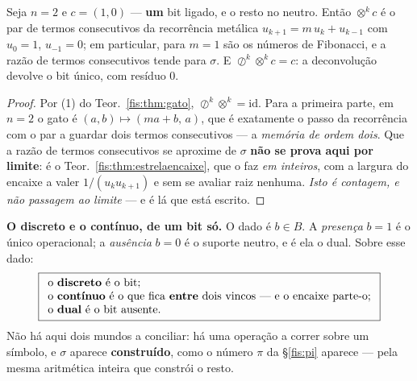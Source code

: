 \documentclass[livro.tex]{subfiles}
\begin{document}
\begin{teorema}\label{fis:thm:bitunico}
Seja $n=2$ e $c=(1,0)$ --- \textbf{um} bit ligado, e o resto no neutro. Então
$\otimes^{k}c$ é o par de termos consecutivos da recorrência metálica
$u_{k+1}=m\,u_k+u_{k-1}$ com $u_0=1$, $u_{-1}=0$; em particular, para $m=1$ são
os números de Fibonacci, e a razão de termos consecutivos tende para $\sigma$. E
$\oslash^{k}\otimes^{k}c=c$: a deconvolução devolve o bit único, com resíduo $0$.
\end{teorema}

\begin{proof}
Por (1) do Teor.~\ref{fis:thm:gato}, $\oslash^{k}\otimes^{k}=\mathrm{id}$. Para a
primeira parte, em $n=2$ o gato é $(a,b)\mapsto(ma+b,\,a)$, que é exatamente o
passo da recorrência com o par a guardar dois termos consecutivos --- a
\emph{memória de ordem dois}. Que a razão de termos consecutivos se aproxime de
$\sigma$ \textbf{não se prova aqui por limite}: é o
Teor.~\ref{fis:thm:estrelaencaixe}, que o faz \emph{em inteiros}, com a largura
do encaixe a valer $1/(u_ku_{k+1})$ e sem se avaliar raiz nenhuma. \emph{Isto é
contagem, e não passagem ao limite} --- e é lá que está escrito.
\end{proof}

\medskip\noindent\textbf{O discreto e o contínuo, de um bit só.} O dado é
$b\in B$. A \emph{presença} $b=1$ é o único operacional; a \emph{ausência} $b=0$
é o suporte neutro, e é ela o dual. Sobre esse dado:
\[
\boxed{
\begin{array}{l}
\text{o \textbf{discreto} é o bit;}\\
\text{o \textbf{contínuo} é o que fica \textbf{entre} dois vincos --- e o encaixe parte-o;}\\
\text{o \textbf{dual} é o bit ausente.}
\end{array}}
\]
Não há aqui dois mundos a conciliar: há uma operação a correr sobre um símbolo, e
$\sigma$ aparece \textbf{construído}, como o número $\pi$ da §\ref{fis:pi}
aparece --- pela mesma aritmética inteira que constrói o resto.
\end{document}
